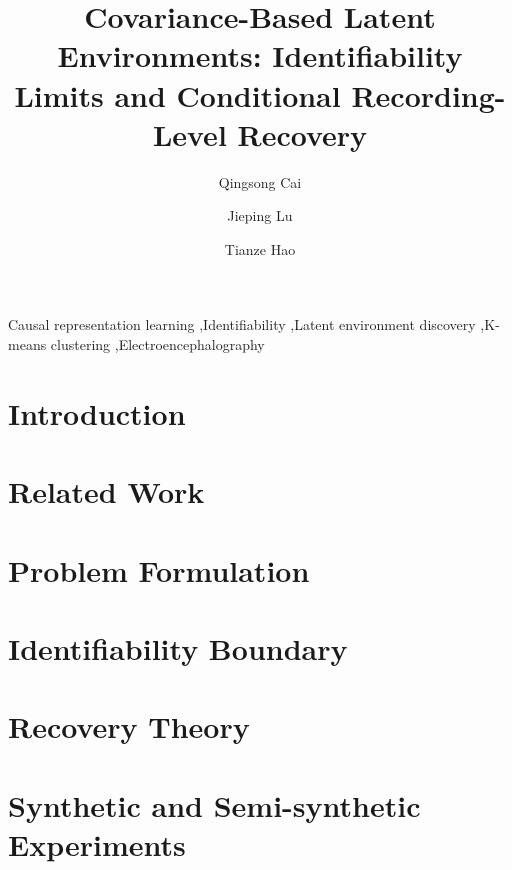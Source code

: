 \documentclass[preprint,12pt]{elsarticle}
\theoremstyle{plain}
\theoremstyle{definition}
\theoremstyle{remark}
\begin{document}
\begin{frontmatter}

\title{Covariance-Based Latent Environments: Identifiability Limits and Conditional Recording-Level Recovery}

\author[inst1]{Qingsong Cai}
\author[inst1]{Jieping Lu}
\author[inst1]{Tianze Hao}

\begin{abstract}

\end{abstract}

\begin{keyword}
Causal representation learning \sep Identifiability \sep Latent environment discovery \sep K-means clustering \sep Electroencephalography
\end{keyword}

\end{frontmatter}
\linenumbers

\section{Introduction}


\section{Related Work}


\section{Problem Formulation}


\section{Identifiability Boundary}


\section{Recovery Theory}


\section{Synthetic and Semi-synthetic Experiments}

\end{document}
